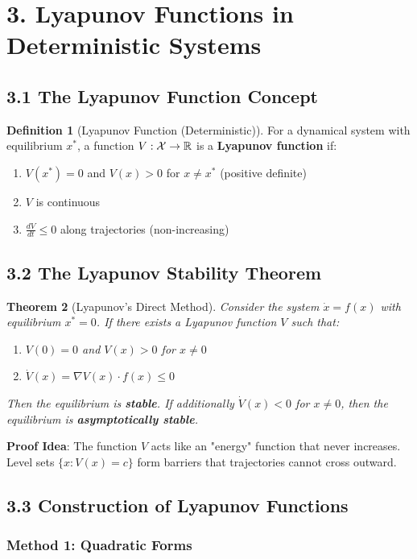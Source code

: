 \documentclass{amsart}
\let\originalmathbb\mathbb
\renewcommand{\mathbb}[1]{%
    \ifstrequal{#1}{1}{\mathbbm{#1}}{\originalmathbb{#1}}%
}
\theoremstyle{plain}
\newtheorem{theorem}{Theorem}[section]
\theoremstyle{definition}
\newtheorem{definition}[theorem]{Definition}
\theoremstyle{remark}
\begin{document}
\section{3. Lyapunov Functions in Deterministic Systems}

\subsection{3.1 The Lyapunov Function Concept}

\begin{definition}[Lyapunov Function (Deterministic)]
For a dynamical system with equilibrium $x^*$, a function $V: \mathcal{X} \to \mathbb{R}$ is a \textbf{Lyapunov function} if:
	\begin{enumerate}
		\item $V(x^*) = 0$ and $V(x) > 0$ for $x \neq x^*$ (positive definite)
		\item $V$ is continuous
		\item $\frac{dV}{dt} \leq 0$ along trajectories (non-increasing)
	\end{enumerate}
\end{definition}
\subsection{3.2 The Lyapunov Stability Theorem}

\begin{theorem}[Lyapunov's Direct Method]
Consider the system $\dot{x} = f(x)$ with equilibrium $x^* = 0$. If there exists a Lyapunov function $V$ such that:
	\begin{enumerate}
		\item $V(0) = 0$ and $V(x) > 0$ for $x \neq 0$
		\item $\dot{V}(x) = \nabla V(x) \cdot f(x) \leq 0$
	\end{enumerate}
Then the equilibrium is \textbf{stable}.
If additionally $\dot{V}(x) < 0$ for $x \neq 0$, then the equilibrium is \textbf{asymptotically stable}.
\end{theorem}
\textbf{Proof Idea}: The function $V$ acts like an "energy" function that never increases. Level sets $\{x: V(x) = c\}$ form barriers that trajectories cannot cross outward.

\subsection{3.3 Construction of Lyapunov Functions}

\subsubsection{Method 1: Quadratic Forms}
\end{document}
